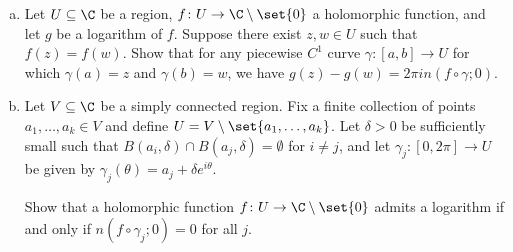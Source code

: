 \documentclass[10pt]{mypackage}
\begin{document}
\begin{problem}[Problem 5]\hfill
  \begin{enumerate}[(a)]
    \item Let $U\subseteq \C$ be a region, $f\colon U\rightarrow \C\setminus \set{0}$ a holomorphic function, and let $g$ be a logarithm of $f$. Suppose there exist $z,w\in U$ such that $f(z) = f(w)$. Show that for any piecewise $C^{1}$ curve $\gamma\colon [a,b]\rightarrow U$ for which $\gamma(a) = z$ and $\gamma(b) = w$, we have $g(z) - g(w) = 2\pi i n \left( f\circ\gamma;0 \right)$.
    \item Let $V\subseteq \C$ be a simply connected region. Fix a finite collection of points $a_1,\dots,a_k\in V$ and define $U = V\setminus \set{a_1,\dots,a_k}$. Let $\delta > 0$ be sufficiently small such that $ B\left( a_i,\delta \right)\cap B\left( a_j,\delta \right) = \emptyset $ for $i\neq j$, and let $\gamma_j\colon [0,2\pi]\rightarrow U$ be given by $\gamma_j\left( \theta \right)= a_j + \delta e^{i\theta}$.\newline

      Show that a holomorphic function $f\colon U\rightarrow \C\setminus \set{0}$ admits a logarithm if and only if $n\left( f\circ\gamma_j;0 \right) = 0$ for all $j$.
  \end{enumerate}
\end{problem}
\end{document}
